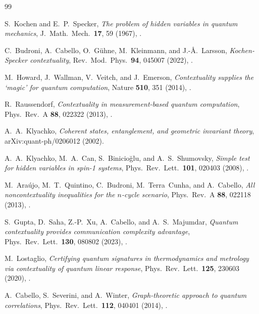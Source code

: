\documentclass[aps,pra,twocolumn,superscriptaddress,longbibliography,floatfix]{revtex4-2}
\begin{document}
\clearpage
\begin{thebibliography}{99}

S.~Kochen and E.~P.~Specker,
\emph{The problem of hidden variables in quantum mechanics},
J.\ Math.\ Mech.\ \textbf{17}, 59 (1967),
.

C.~Budroni, A.~Cabello, O.~G\"uhne, M.~Kleinmann, and J.-\AA.~Larsson,
\emph{Kochen-Specker contextuality},
Rev.\ Mod.\ Phys.\ \textbf{94}, 045007 (2022),
.

M.~Howard, J.~Wallman, V.~Veitch, and J.~Emerson,
\emph{Contextuality supplies the `magic' for quantum computation},
Nature \textbf{510}, 351 (2014),
.

R.~Raussendorf,
\emph{Contextuality in measurement-based quantum computation},
Phys.\ Rev.\ A \textbf{88}, 022322 (2013),
.

A.~A.~Klyachko,
\emph{Coherent states, entanglement, and geometric invariant theory},
arXiv:quant-ph/0206012 (2002).

A.~A.~Klyachko, M.~A.~Can, S.~Binicioğlu, and A.~S.~Shumovsky,
\emph{Simple test for hidden variables in spin-1 systems},
Phys.\ Rev.\ Lett.\ \textbf{101}, 020403 (2008),
.

M.~Ara\'{u}jo, M.~T.~Quintino, C.~Budroni, M.~Terra~Cunha, and A.~Cabello,
\emph{All noncontextuality inequalities for the $n$-cycle scenario},
Phys.\ Rev.\ A \textbf{88}, 022118 (2013),
.

S.~Gupta, D.~Saha, Z.-P.~Xu, A.~Cabello, and A.~S.~Majumdar,
\emph{Quantum contextuality provides communication complexity advantage},
Phys.\ Rev.\ Lett.\ \textbf{130}, 080802 (2023),
.

M.~Lostaglio,
\emph{Certifying quantum signatures in thermodynamics and metrology via
contextuality of quantum linear response},
Phys.\ Rev.\ Lett.\ \textbf{125}, 230603 (2020),
.

A.~Cabello, S.~Severini, and A.~Winter,
\emph{Graph-theoretic approach to quantum correlations},
Phys.\ Rev.\ Lett.\ \textbf{112}, 040401 (2014),
.


\end{thebibliography}
\end{document}
